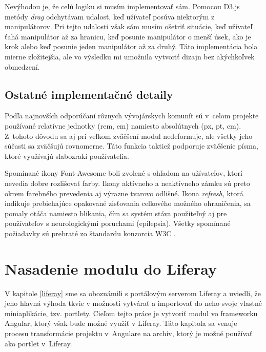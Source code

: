 \documentclass[
  digital, %
  twoside, %
  notable,   %
  nolof,   %
  nolot,   %
]{fithesis3}
\begin{document}
Nevýhodou je, že celú logiku si musím implementovať sám. Pomocou D3.js metódy \textit{drag} odchytávam udalosť, keď užívateľ posúva niektorým z manipulátorov. Pri tejto udalosti však sám musím ošetriť situácie, keď užívateľ ťahá manipulátor až za hranicu, keď posunie manipulátor o menší úsek, ako je krok alebo keď posunie jeden manipulátor až za druhý. Táto implementácia bola mierne zložitejšia, ale vo výsledku mi umožnila vytvoriť dizajn bez akýchkoľvek obmedzení.

\section{Ostatné implementačné detaily}
Podľa najnovších odporúčaní rôznych vývojárskych komunít \cite{Etienne2017} sú v~celom projekte používané relatívne jednotky (rem, em) namiesto absolútnych (px, pt, cm). Z~tohoto dôvodu sa aj pri veľkom zväčšení modul nedeformuje, ale všetky jeho súčasti sa zväčšujú rovnomerne. Táto funkcia taktiež podporuje zväčšenie písma, ktoré využívajú slabozrakí používatelia.

Spomínané ikony Font-Awesome boli zvolené s ohľadom na užívateľov, ktorí nevedia dobre rozlišovať farby. Ikony aktívneho a neaktívneho zámku sú preto okrem farebného prevedenia aj výrazne tvarovo odlišné. Ikona \textit{refresh}, ktorá indikuje prebiehajúce opakované zisťovania celkového možného ohraničenia, sa pomaly otáča namiesto blikania, čím sa systém stáva použiteľný aj pre používateľov s neurologickými poruchami (epilepsia). Všetky spomínané požiadavky sú prebraté zo štandardu konzorcia W3C \cite{caldwell2008web}.

\chapter{Nasadenie modulu do Liferay}
V kapitole \ref{liferay} sme sa oboznámili s portálovým serverom Liferay a uviedli, že jeho hlavná výhoda tkvie v možnosti vytvárať a importovať do neho svoje vlastné miniaplikácie, tzv. portlety. Cieľom tejto práce je vytvoriť modul vo frameworku Angular, ktorý však bude možné využiť v Liferay. Táto kapitola sa venuje procesu transformácie projektu v~Angulare na archív, ktorý je možné používať ako portlet v~Liferay.
\end{document}
